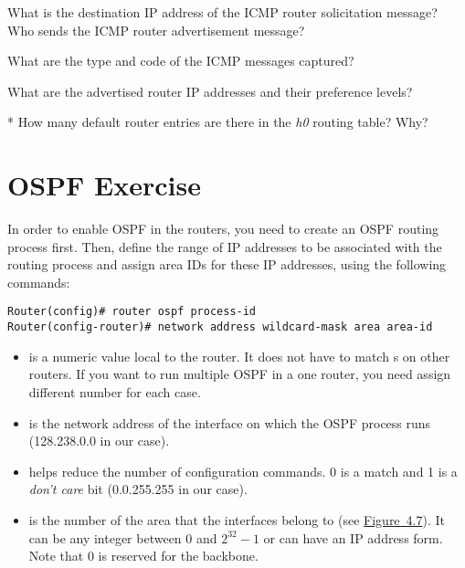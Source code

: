 \documentclass{../UTNetLab}
\begin{document}
    \begin{report}
        \item What is the destination IP address of the ICMP router solicitation message? Who sends the ICMP router advertisement message?
        \item What are the type and code of the ICMP messages captured?
        \item What are the advertised router IP addresses and their preference levels?
        \item [*] How many default router entries are there in the \textit{h0} routing table? Why?
    \end{report}

\part{OSPF Exercise}\label{sec:ospf}
    In order to enable OSPF in the routers, you need to create an OSPF routing process first.
    Then, define the range of IP addresses to be associated with the routing process and assign area IDs for these IP addresses, using the following commands:
    \begin{lstlisting}[language={cisco}, emph={process-id, area-id, address, wildcard-mask}]
Router(config)# router ospf process-id
Router(config-router)# network address wildcard-mask area area-id
    \end{lstlisting}
    
    \begin{itemize}
        \item {} is a numeric value local to the router.
        It does not have to match s on other routers.
        If you want to run multiple OSPF in a one router, you need assign different number for each case.

        \item {} is the network address of the interface on which the OSPF process runs (128.238.0.0 in our case).

        \item {} helps reduce the number of configuration commands.
        0 is a match and 1 is a \textit{don’t care} bit (0.0.255.255 in our case).
        
        \item {} is the number of the area that the interfaces belong to (see \hyperref[fig:4.7]{Figure~4.7}).
        It can be any integer between 0 and $2^{32} - 1$ or can have an IP address form.
        Note that 0 is reserved for the backbone.
\end{itemize}
 
\end{document}
